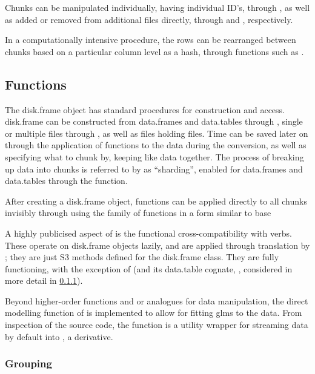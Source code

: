 Chunks can be manipulated individually, having individual ID's, through , as well as added or removed from additional  files directly, through  and , respectively.

In a computationally intensive procedure, the rows can be rearranged between chunks based on a particular column level as a hash, through functions such as .

\subsection{Functions}\label{sec:functions}

The disk.frame object has standard procedures for construction and access.
disk.frame can be constructed from data.frames and data.tables
through , single or
multiple  files through
, as well as 
files holding  files.
Time can be saved later on through the application of functions to the data during the conversion, as well as specifying what to chunk by, keeping like data together.
The process of breaking up data into chunks is referred to by  as ``sharding'', enabled for data.frames and data.tables through the  function.

After creating a disk.frame object, functions can be applied directly to all chunks invisibly through using the  family of functions in a form similar to base \R{} 

A highly publicised aspect of  is the functional cross-compatibility with  verbs.
These operate on disk.frame objects lazily, and are applied through translation by ; they are just S3 methods defined for the disk.frame class.
They are fully functioning, with the exception of  (and its data.table cognate, , considered in more detail in \cref{sec:spec-cons-group-by}).

Beyond higher-order functions and  or  analogues for data manipulation, the direct modelling function of  is implemented to allow for fitting glms to the data.
From inspection of the source code, the function is a utility wrapper for streaming  data by default into , a  derivative.

\subsubsection{Grouping}\label{sec:spec-cons-group-by}

